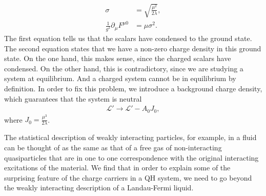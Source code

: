         \begin{align}
            \sigma &= \sqrt{\frac{\mu^2}{2\lambda}}  \label{eq:chem_pot_local_symmetry_eom1}, \\
            \frac{1}{g^2} \partial_{\mu} F^{\mu 0} &= \mu \sigma^2. \label{eq:chem_pot_local_symmetry_eom2}
        \end{align}
        The first equation tells us that the scalars have condensed to the ground state. The second equation states that we have a non-zero charge density in this ground state. On the one hand, this makes sense, since the charged scalars have condensed. On the other hand, this is contradictory, since we are studying a system at equilibrium. And a charged system cannot be in equilibrium by definition. In order to fix this problem, we introduce a background charge density, which guarantees that the system is neutral 
        \begin{align}
            \mathcal{L}' \rightarrow \mathcal{L}' - A_0 J_0,
        \end{align}
        where $J_0 = \frac{\mu^3}{2\lambda}$.

        The statistical description of weakly interacting particles, for example, in a fluid can be thought of as the same as that of a free gas of non-interacting quasiparticles that are in one to one correspondence with the original interacting excitations of the material. We find that in order to explain some of the surprising feature of the charge carriers in a QH system, we need to go beyond the weakly interacting description of a Landau-Fermi liquid.
